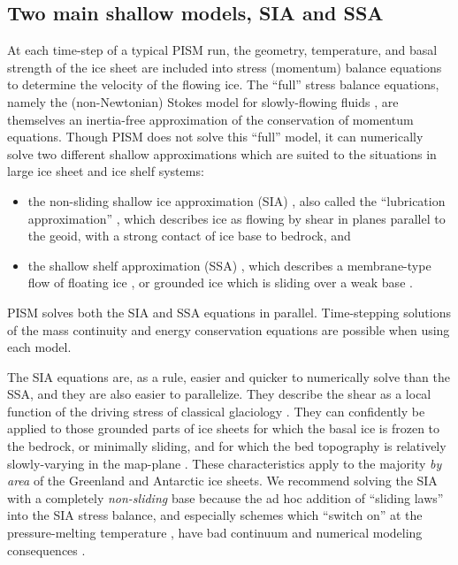 \documentclass[titlepage,letterpaper,final]{scrartcl}
\begin{document}
\subsection{Two main shallow models, SIA and SSA}  At each time-step of a typical PISM run, the geometry, temperature, and basal strength of the ice sheet are included into stress (momentum) balance equations to determine the velocity of the flowing ice.   The ``full'' stress balance equations, namely the (non-Newtonian) Stokes model for slowly-flowing fluids \cite{Fowler}, are themselves an inertia-free approximation of the conservation of momentum equations.  Though PISM does not solve this ``full'' model, it can numerically solve two different shallow approximations which are suited to the situations in large ice sheet and ice shelf systems:
\begin{itemize}
\item the non-sliding shallow ice approximation (SIA) \cite{Hutter}, also called the ``lubrication approximation'' \cite{Fowler}, which describes ice as flowing by shear in planes parallel to the geoid, with a strong contact of ice base to bedrock, and
\item the shallow shelf approximation (SSA) \cite{WeisGreveHutter}, which describes a membrane-type flow of floating ice \cite{Morland}, or grounded ice which is sliding over a weak base \cite{MacAyeal,SchoofStream}.
\end{itemize}
PISM solves both the SIA and SSA equations in parallel.  Time-stepping solutions of the mass continuity and energy conservation equations are possible when using each model.

The SIA equations are, as a rule, easier and quicker to numerically solve than the SSA, and they are also easier to parallelize.  They describe the shear as a local function of the driving stress of classical glaciology \cite{Paterson}.  They can confidently be applied to those grounded parts of ice sheets for which the basal ice is frozen to the bedrock, or minimally sliding, and for which the bed topography is relatively slowly-varying in the map-plane \cite{Fowler}.  These characteristics apply to the majority \emph{by area} of the Greenland and Antarctic ice sheets.  We recommend solving the SIA with a completely \emph{non-sliding} base because the ad hoc addition of ``sliding laws'' into the SIA stress balance, and especially schemes which ``switch on'' at the pressure-melting temperature \cite{EISMINT00}, have bad continuum and numerical modeling consequences \cite[appendix B]{BBssasliding}.
\end{document}
